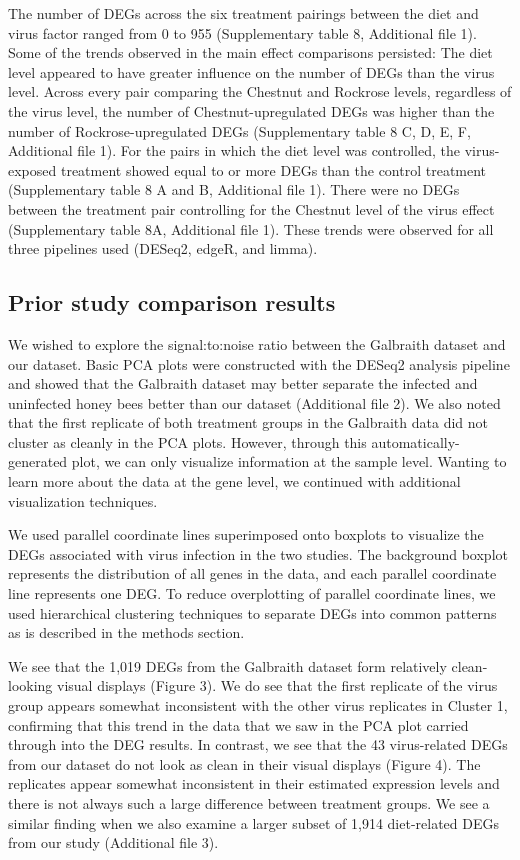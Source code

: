\documentclass{bmcart}
\begin{document}
\begin{linenumbers}
\begin{doublespacing}
The number of DEGs across the six treatment pairings between the diet and virus factor ranged from 0 to 955 (Supplementary table 8, Additional file 1). Some of the trends observed in the main effect comparisons persisted: The diet level appeared to have greater influence on the number of DEGs than the virus level. Across every pair comparing the Chestnut and Rockrose levels, regardless of the virus level, the number of Chestnut-upregulated DEGs was higher than the number of Rockrose-upregulated DEGs (Supplementary table 8 C, D, E, F, Additional file 1). For the pairs in which the diet level was controlled, the virus-exposed treatment showed equal to or more DEGs than the control treatment (Supplementary table 8 A and B, Additional file 1). There were no DEGs between the treatment pair controlling for the Chestnut level of the virus effect (Supplementary table 8A, Additional file 1). These trends were observed for all three pipelines used (DESeq2, edgeR, and limma).

\subsection*{Prior study comparison results}

We wished to explore the signal:to:noise ratio between the Galbraith dataset and our dataset. Basic PCA plots were constructed with the DESeq2 analysis pipeline and showed that the Galbraith dataset may better separate the infected and uninfected honey bees better than our dataset (Additional file 2). We also noted that the first replicate of both treatment groups in the Galbraith data did not cluster as cleanly in the PCA plots. However, through this automatically-generated plot, we can only visualize information at the sample level. Wanting to learn more about the data at the gene level, we continued with additional visualization techniques.

We used parallel coordinate lines superimposed onto boxplots to visualize the DEGs associated with virus infection in the two studies. The background boxplot represents the distribution of all genes in the data, and each parallel coordinate line represents one DEG. To reduce overplotting of parallel coordinate lines, we used hierarchical clustering techniques to separate DEGs into common patterns as is described in the methods section.

We see that the 1,019 DEGs from the Galbraith dataset form relatively clean-looking visual displays (Figure 3). We do see that the first replicate of the virus group appears somewhat inconsistent with the other virus replicates in Cluster 1, confirming that this trend in the data that we saw in the PCA plot carried through into the DEG results. In contrast, we see that the 43 virus-related DEGs from our dataset do not look as clean in their visual displays (Figure 4). The replicates appear somewhat inconsistent in their estimated expression levels and there is not always such a large difference between treatment groups. We see a similar finding when we also examine a larger subset of 1,914 diet-related DEGs from our study (Additional file 3).


\end{doublespacing}
\end{linenumbers}
\end{document}
